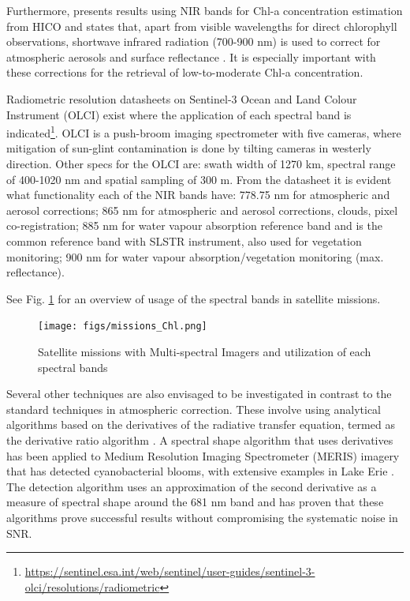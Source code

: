 Furthermore, \cite{Gitelson2011} presents results using NIR bands for Chl-a concentration estimation from HICO and states that, apart from visible wavelengths for direct chlorophyll observations, shortwave infrared radiation (700-900 nm) is used to correct for atmospheric aerosols and surface reflectance \cite{Corson2011}. It is especially important with these corrections for the retrieval of low-to-moderate Chl-a concentration.

Radiometric resolution datasheets on Sentinel-3 Ocean and Land Colour Instrument (OLCI) exist where the application of each spectral band is indicated\footnote{\url{https://sentinel.esa.int/web/sentinel/user-guides/sentinel-3-olci/resolutions/radiometric}}. OLCI is a push-broom imaging spectrometer with five cameras, where mitigation of sun-glint contamination is done by tilting cameras in westerly direction. Other specs for the OLCI are: swath width of 1270 km, spectral range of 400-1020 nm and spatial sampling of 300 m. From the datasheet it is evident what functionality each of the NIR bands have: 778.75 nm for atmospheric and aerosol corrections; 865 nm for atmospheric and aerosol corrections, clouds, pixel co-registration; 885 nm for water vapour absorption reference band and is the common reference band with SLSTR instrument, also used for vegetation monitoring; 900 nm for water vapour absorption/vegetation monitoring (max. reflectance).

See Fig. \ref{fig:missions_chl} for an overview of usage of the spectral bands in satellite missions.
\begin{figure}[htbp]
  \centering
      \texttt{[image: figs/missions\_Chl.png]}
  \caption{Satellite missions with Multi-spectral Imagers and utilization of each spectral bands \cite{Patissier2014}}
	\label{fig:missions_chl}
\end{figure}
Several other techniques are also envisaged to be investigated in contrast to the standard techniques in atmospheric correction. These involve using analytical algorithms based on the derivatives of the radiative transfer equation, termed as the derivative ratio algorithm \cite{Philpot1991}. A spectral shape algorithm that uses derivatives has been applied to Medium Resolution Imaging Spectrometer (MERIS) imagery that has detected cyanobacterial blooms, with extensive examples in Lake Erie \cite{Wynne2013}. The detection algorithm uses an approximation of the second derivative as a measure of spectral shape around the 681 nm band and has proven that these algorithms prove successful results without compromising the systematic noise in SNR.

